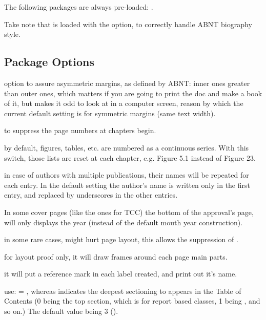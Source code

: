 \documentclass[article,nofontwarning,nogeometry,english,tocdepth=3,secdepth=3]{ufrgscca} %
\begin{document}
The following packages are always pre-loaded: .

Take note that  is loaded with the \textbf{} option, to correctly handle ABNT biography style.

\subsection{Package Options}


\begin{describelist}{option}
	 {to assure asymmetric margins, as defined by ABNT: inner ones greater than outer ones, which matters if you are going to print the doc and make a book of it, but makes it odd to look at in a computer screen, reason by which the current default setting is for symmetric margins (same text width).}

 	 { to suppress the page numbers at chapters begin.}

	 {by default, figures, tables, etc. are numbered as a continuous series. With this switch, those lists are reset at each chapter, e.g. Figure 5.1 instead of Figure 23.}

	 {in case of authors with multiple publications, their names will be repeated for each entry. In the default setting the author's name is written only in the first entry, and replaced by underscores in the other entries.}

     {In some cover pages (like the ones for TCC) the bottom of the approval's page, will only displays the year (instead of the default mouth year construction).}
  
	 {in some rare cases,  might hurt page layout, this allows the suppression of .}

	 {for layout proof only, it will draw frames around each page main parts.}

	 {it will put a reference mark in each label created, and print out it's name.}

	 {use:  = , whereas  indicates the deepest sectioning to appears in the Table of Contents (0 being the top section, which is \tsmacro{\chapter}{} for report based classes, 1 being \tsmacro{\section}{}, and so on.) The default value being 3 (\tsmacro{\subsubsection}{}).}


\end{describelist}
\end{document}
